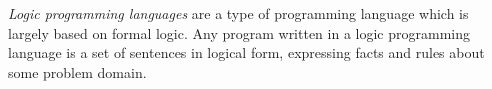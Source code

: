 \begin{definition}\label{def:Logical_Programming_Language}
  \emph{Logic programming languages} are a type of programming language which is largely based on formal logic.
  Any program written in a logic programming language is a set of sentences in logical form, expressing facts and rules about some problem domain.
\end{definition}
